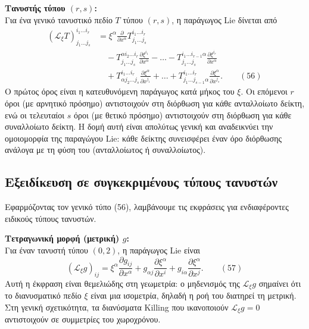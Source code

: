 \documentclass[12pt]{article}
\begin{document}
\textbf{Τανυστής τύπου $(r, s)$:}\\
Για ένα γενικό τανυστικό πεδίο $T$ τύπου $(r, s)$, η παράγωγος Lie δίνεται από
\begin{equation}
\begin{aligned}
(\mathcal{L}_\xi T)^{i_1 \dots i_r}_{j_1 \dots j_s} &= \xi^\alpha \frac{\partial}{\partial x^\alpha} T^{i_1 \dots i_r}_{j_1 \dots j_s} \\
&\quad - T^{\alpha i_2 \dots i_r}_{j_1 \dots j_s} \frac{\partial \xi^{i_1}}{\partial x^\alpha} - \dots - T^{i_1 \dots i_{r-1} \alpha}_{j_1 \dots j_s} \frac{\partial \xi^{i_r}}{\partial x^\alpha} \\
&\quad + T^{i_1 \dots i_r}_{\alpha j_2 \dots j_s} \frac{\partial \xi^\alpha}{\partial x^{j_1}} + \dots + T^{i_1 \dots i_r}_{j_1 \dots j_{s-1} \alpha} \frac{\partial \xi^\alpha}{\partial x^{j_s}}. \qquad (56)
\end{aligned}
\end{equation}
Ο πρώτος όρος είναι η κατευθυνόμενη παράγωγος κατά μήκος του $\xi$. Οι επόμενοι $r$ όροι (με αρνητικό πρόσημο) αντιστοιχούν στη διόρθωση για κάθε ανταλλοίωτο δείκτη, ενώ οι τελευταίοι $s$ όροι (με θετικό πρόσημο) αντιστοιχούν στη διόρθωση για κάθε συναλλοίωτο δείκτη. Η δομή αυτή είναι απολύτως γενική και αναδεικνύει την ομοιομορφία της παραγώγου Lie: κάθε δείκτης συνεισφέρει έναν όρο διόρθωσης ανάλογα με τη φύση του (ανταλλοίωτος ή συναλλοίωτος).

\subsection{Εξειδίκευση σε συγκεκριμένους τύπους τανυστών}

Εφαρμόζοντας τον γενικό τύπο (56), λαμβάνουμε τις εκφράσεις για ενδιαφέροντες ειδικούς τύπους τανυστών.

\textbf{Τετραγωνική μορφή (μετρική) $g$:}\\
Για έναν τανυστή τύπου $(0,2)$, η παράγωγος Lie είναι
\begin{equation}
(\mathcal{L}_\xi g)_{ij} = \xi^\alpha \frac{\partial g_{ij}}{\partial x^\alpha} + g_{\alpha j} \frac{\partial \xi^\alpha}{\partial x^i} + g_{i\alpha} \frac{\partial \xi^\alpha}{\partial x^j}. \qquad (57)
\end{equation}
Αυτή η έκφραση είναι θεμελιώδης στη γεωμετρία: ο μηδενισμός της $\mathcal{L}_\xi g$ σημαίνει ότι το διανυσματικό πεδίο $\xi$ είναι μια ισομετρία, δηλαδή η ροή του διατηρεί τη μετρική. Στη γενική σχετικότητα, τα διανύσματα Killing που ικανοποιούν $\mathcal{L}_\xi g = 0$ αντιστοιχούν σε συμμετρίες του χωροχρόνου.
\end{document}
